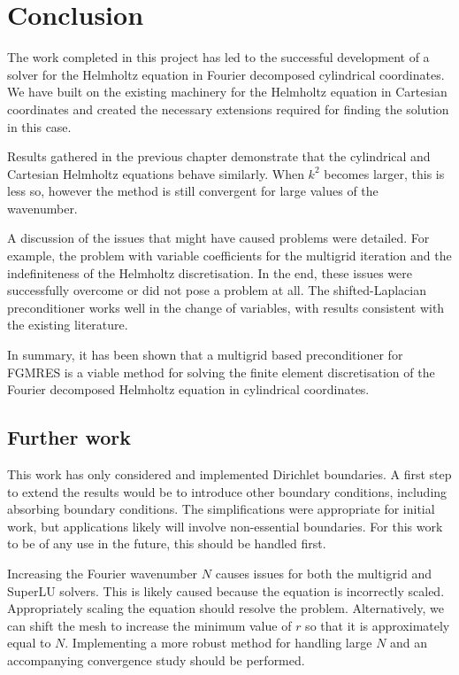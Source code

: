 \chapter{Conclusion}

The work completed in this project has led to the successful development of a solver for the Helmholtz equation in Fourier decomposed cylindrical coordinates.
We have built on the existing machinery for the Helmholtz equation in Cartesian coordinates and created the necessary extensions required for finding the solution in this case.

Results gathered in the previous chapter demonstrate that the cylindrical and Cartesian Helmholtz equations behave similarly.
When $k^2$ becomes larger, this is less so, however the method is still convergent for large values of the wavenumber.

A discussion of the issues that might have caused problems were detailed.
For example, the problem with variable coefficients for the multigrid iteration and the indefiniteness of the Helmholtz discretisation.
In the end, these issues were successfully overcome or did not pose a problem at all.
The shifted-Laplacian preconditioner works well in the change of variables, with results consistent with the existing literature.

In summary, it has been shown that a multigrid based preconditioner for FGMRES is a viable method for solving the finite element discretisation of the Fourier decomposed Helmholtz equation in cylindrical coordinates.






\section{Further work}

This work has only considered and implemented Dirichlet boundaries.
A first step to extend the results would be to introduce other boundary conditions, including absorbing boundary conditions.
The simplifications were appropriate for initial work, but applications likely will involve non-essential boundaries.
For this work to be of any use in the future, this should be handled first.

Increasing the Fourier wavenumber $N$ causes issues for both the multigrid and SuperLU solvers.
This is likely caused because the equation is incorrectly scaled.
Appropriately scaling the equation should resolve the problem.
Alternatively, we can shift the mesh to increase the minimum value of $r$ so that it is approximately equal to $N$.
Implementing a more robust method for handling large $N$ and an accompanying convergence study should be performed.

